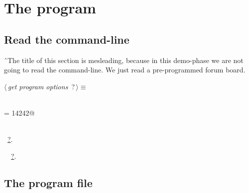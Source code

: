 \documentclass[twoside]{artikel3}
\renewcommand{\NWlink}[2]{\hyperlink{#1}{#2}}
\renewcommand{\NWtarget}[2]{\hypertarget{#1}{#2}}
\renewcommand{\NWsep}{$\diamond$\rule[-1\baselineskip]{0pt}{1\baselineskip}}
\renewcommand{\NWlink}[2]{\hyperlink{#1}{#2}}
\renewcommand{\NWtarget}[2]{\hypertarget{#1}{#2}}
\begin{document}
\section{The program}
\label{sec:program}



\subsection{Read the command-line}
\label{sec:read-commandline}

ˆThe title of this section is mesleading, because in this demo-phase
we are not going to read the command-line. We just read a
pre-programmed forum board.

\begin{flushleft} \small
\begin{minipage}{\linewidth}\label{scrap2}\raggedright\small
\NWtarget{nuweb?}{} $\langle\,${\itshape get program options}\nobreak\ {\footnotesize {?}}$\,\rangle\equiv$
\vspace{-1ex}
\begin{list}{}{} \item
\mbox{}\verb@@\\
\mbox{}\verb@boardnum = 14242@\\
\mbox{}\verb@@\\
\mbox{}\verb@@{\NWsep}
\end{list}
\vspace{-1.5ex}
\footnotesize
\begin{list}{}{\setlength{\itemsep}{-\parsep}\setlength{\itemindent}{-\leftmargin}}
\item \NWtxtMacroRefIn\ \NWlink{nuweb?}{?}.
\item \NWtxtIdentsDefed\nobreak\  \verb@boardnum@\nobreak\ \NWlink{nuweb?}{?}.
\item{}
\end{list}
\end{minipage}\vspace{4ex}
\end{flushleft}
\subsection{The program file}
\label{sec:program-file}
\end{document}
